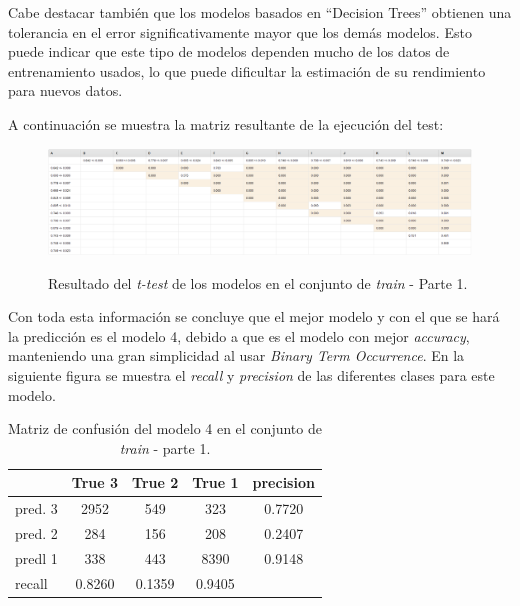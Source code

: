 \documentclass[es]{uc3mreport}
\begin{document}
\begin{report}
    Cabe destacar también que los modelos basados en ``Decision Trees'' obtienen
    una tolerancia en el error significativamente mayor que los demás modelos.
    Esto puede indicar que este tipo de modelos dependen mucho de los datos de
    entrenamiento usados, lo que puede dificultar la estimación de su rendimiento
    para nuevos datos.

    A continuación se muestra la matriz resultante de la ejecución del test:

    \begin{figure}[H]
        \center
        \includegraphics[width=\linewidth]{t_test1.jpeg}\\
        \caption{Resultado del \textit{t-test} de los modelos en el conjunto de
        \textit{train} - Parte 1.}
    \end{figure}

    Con toda esta información se concluye que el mejor modelo y con el que se hará
    la predicción es el modelo 4, debido a que es el modelo con mejor
    \textit{accuracy}, manteniendo una gran simplicidad al usar \textit{Binary Term
    Occurrence}. En la siguiente figura se muestra el \textit{recall} y
    \textit{precision} de las diferentes clases para este modelo.

\begin{table}[H]
\center
\begin{tabular}{@{}lccc|c@{}}
    \toprule
             & True 3 & True 2 & True 1 & precision\\
    \hline
    pred. 3  & 2952   & 549    & 323    & 0.7720   \\
    pred. 2  & 284    & 156    & 208    & 0.2407   \\
    predl 1  & 338    & 443    & 8390   & 0.9148   \\
    \hline
    recall   & 0.8260 & 0.1359 & 0.9405 &          \\
    \bottomrule
\end{tabular}
\caption{Matriz de confusión del modelo 4 en el conjunto de \textit{train} -
parte 1.}
\end{table}


\end{report}
\end{document}
